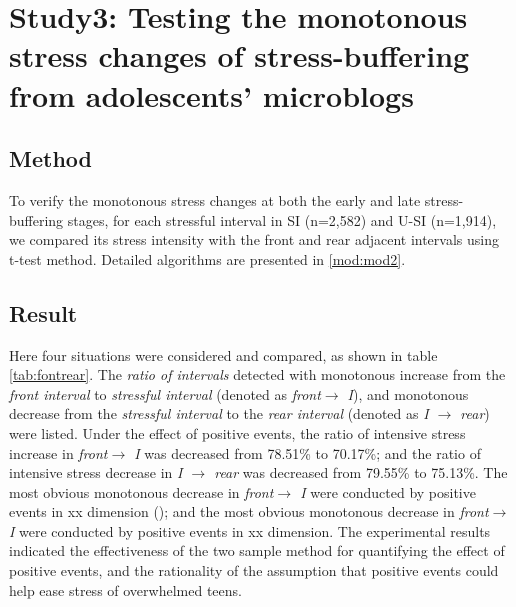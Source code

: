 \section{Study3: Testing the monotonous stress changes of stress-buffering from adolescents' microblogs}
\subsection{Method}
To verify the monotonous stress changes at both the early and late stress-buffering stages,
for each stressful interval in SI (n=2,582) and U-SI (n=1,914),
we compared its stress intensity with the front and rear adjacent intervals using t-test method.
Detailed algorithms are presented in \ref{mod:mod2}.

\subsection{Result}
Here four situations were considered and compared,
as shown in table \ref{tab:fontrear}.
The \emph{ratio of intervals} detected with monotonous increase from the \emph{front interval} to \emph{stressful interval} (denoted as \emph{front$ \rightarrow$ I}),
and monotonous decrease from the \emph{stressful interval} to the \emph{rear interval} (denoted as \emph{I $\rightarrow$ rear}) were listed.
Under the effect of positive events,
the ratio of intensive stress increase in \emph{front$ \rightarrow$ I} was decreased from 78.51\% to 70.17\%;
and the ratio of intensive stress decrease in \emph{I $\rightarrow$ rear} was decreased from 79.55\% to 75.13\%.
The most obvious monotonous decrease in \emph{front$ \rightarrow$ I} were conducted by positive events in xx dimension ();
and the most obvious monotonous decrease in \emph{front$ \rightarrow$ I} were conducted by positive events in xx dimension.
The experimental results indicated the effectiveness of the two sample method for quantifying the effect of positive events,
and the rationality of the assumption that positive events could help ease stress of overwhelmed teens.
